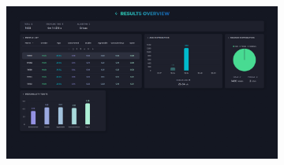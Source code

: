 \begin{figure}[H]
	\centering
	\begin{subfigure}[c]{0.74\textwidth}
			\centering
			\includegraphics[width=\textwidth]{imagenes/dashboard-grivas-500.png}
			\label{fig:casouso_dashboard_grivas_escritorio}
	\end{subfigure}
	\hfill
	\begin{subfigure}[c]{0.21\textwidth}
		\centering

\end{subfigure}
\end{figure}
